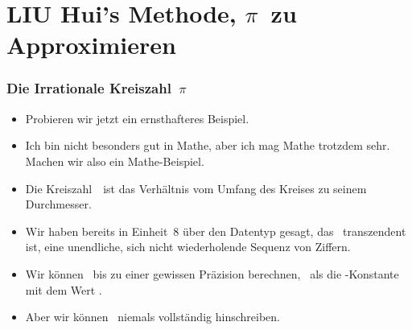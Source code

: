 \documentclass[aspectratio=169,mathserif,notheorems]{beamer}%
\begin{document}
\section{LIU Hui's Methode, $\pi$~zu Approximieren}%
%
\begin{frame}%
\frametitle{Die Irrationale Kreiszahl~$\pi$}%
\begin{itemize}%
\item Probieren wir jetzt ein ernsthafteres Beispiel.%
\item<2-> Ich bin nicht besonders gut in Mathe, aber ich mag Mathe trotzdem sehr. Machen wir also ein Mathe-Beispiel.%
\item<3-> Die Kreiszahl~\numberPi\ ist das Verhältnis vom Umfang des Kreises zu seinem Durchmesser.%
\item<4-> Wir haben bereits in Einheit~8 über den Datentyp  gesagt, das \numberPi\ transzendent ist, eine unendliche, sich nicht wiederholende Sequenz von Ziffern.%
\item<5-> Wir können \numberPi\ bis zu einer gewissen Präzision berechnen, \DEzB~als die -Konstante  mit dem Wert .%
\item<6-> Aber wir können \numberPi\ niemals vollständig hinschreiben.%
\end{itemize}%
\end{frame}%
%
\end{document}
